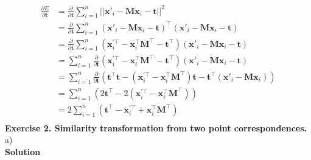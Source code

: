 \documentclass[letterpaper, 11pt]{article}
\begin{document}
\begin{align*}
    \frac{\partial E}{\partial \textbf{t}} & = \frac{\partial}{\partial\textbf{t}}\sum_{i=1}^{n} ||\textbf{x}'_i-\textbf{M}\textbf{x}_i-\textbf{t}||^2                                                                                                  \\
                                           & =\frac{\partial}{\partial\textbf{t}}\sum_{i=1}^{n} (\textbf{x}'_i-\textbf{M}\textbf{x}_i-\textbf{t})^\top (\textbf{x}'_i-\textbf{M}\textbf{x}_i-\textbf{t})                                                \\
                                           & =\frac{\partial}{\partial\textbf{t}}\sum_{i=1}^{n} (\textbf{x}_i^{'\top}-\textbf{x}_i^{\top}\textbf{M}^{\top}-\textbf{t}^{\top}) (\textbf{x}'_i-\textbf{M}\textbf{x}_i-\textbf{t})                         \\
                                           & =\sum_{i=1}^{n} \frac{\partial}{\partial\textbf{t}}(\textbf{x}_i^{'\top}-\textbf{x}_i^{\top}\textbf{M}^{\top}-\textbf{t}^{\top}) (\textbf{x}'_i-\textbf{M}\textbf{x}_i-\textbf{t})                         \\
                                           & =\sum_{i=1}^{n} \frac{\partial}{\partial\textbf{t}}(\textbf{t}^\top\textbf{t}-(\textbf{x}_i^{'\top}-\textbf{x}_i^{\top}\textbf{M}^{\top})\textbf{t}-\textbf{t}^\top(\textbf{x}'_i-\textbf{M}\textbf{x}_i)) \\
                                           & =\sum_{i=1}^{n} (2\textbf{t}^\top-2(\textbf{x}_i^{'\top}-\textbf{x}_i^{\top}\textbf{M}^{\top}))                                                                                                            \\
                                           & =2\sum_{i=1}^{n} (\textbf{t}^\top-\textbf{x}_i^{'\top}+\textbf{x}_i^{\top}\textbf{M}^{\top})                                                                                                               \\
\end{align*}
\textbf{Exercise 2. Similarity transformation from two point correspondences.}\\
a)\\
\textbf{Solution}
\end{document}
